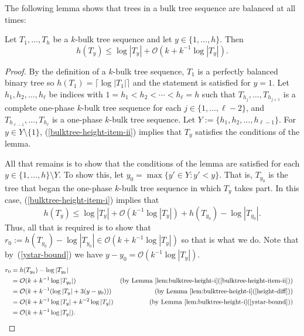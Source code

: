 \documentclass[kpfonts]{patmorin}
\newcommand{\Oh}{\mathcal{O}}
\let\le\leqslant
\begin{document}
The following lemma shows that trees in a bulk tree sequence are balanced at all times:

\begin{lem}
  Let $T_1,\ldots,T_h$ be a $k$-bulk tree sequence and let $y\in\{1,\ldots,h\}$.
  Then
\[
h(T_y)\le \log|T_y| + \Oh(k+k^{-1}\log|T_y|).
\]
\end{lem}

\begin{proof}
  By the definition of a $k$-bulk tree sequence, $T_1$ is a perfectly balanced binary tree so $h(T_1)=\lceil\log|T_1|\rceil$ and the statement is satisfied for $y=1$.
  Let $h_1,h_2,\ldots,h_{\ell}$ be indices with $1=h_1 < h_2 < \cdots <h_{\ell} = h$ such that $T_{h_j},\ldots,T_{h_{j+1}}$ is a complete one-phase $k$-bulk tree sequence for each $j\in\{1,\ldots,\ell-2\}$, and $T_{h_{\ell-1}},\ldots,T_{h_{\ell}}$ is a one-phase $k$-bulk tree sequence.
  Let $Y:= \{h_1,h_2,\ldots,h_{\ell-1}\}$.
  For $y\in Y\setminus\{1\}$,
  (\ref{bulktree-height-item-ii}) implies that $T_y$ satisfies the conditions of the lemma.

  All that remains is to show that the conditions of the lemma are satisfied for each $y\in\{1,\ldots,h\}\setminus Y$. To show this, let $y_0=\max\{ y'\in Y: y'<y\}$.  That is, $T_{y_0}$ is the tree that began the one-phase $k$-bulk tree sequence in which $T_y$ takes part.
  In this case, (\ref{bulktree-height-item-i}) implies that
  \[  h(T_y) \le \log |T_y| + \Oh(k^{-1}\log |T_y|) + h(T_{y_0})-\log|T_{y_0}|.\]
  Thus, all that is required is to show that $r_0:=h(T_{y_0})-\log|T_{y_0}|\in \Oh(k+k^{-1}\log|T_y|)$ so that is what we do.
  Note that by~(\ref{ystar-bound})
  we have $y-y_0 = \Oh(k^{-1}\log|T_y|)$.
  \begin{align*}
    r_0 &= h(T_{y_0})-\log|T_{y_0}| \\
       &= \Oh(k + k^{-1}\log|T_{y_0}|)
        & \text{(by \lemref{bulktree-height-i}(\ref{bulktree-height-item-ii}))}\\
       &= \Oh(k + k^{-1}(\log|T_{y}| + 3(y-y_0)))
        & \text{(by \lemref{bulktree-height-i}(\ref{height-diff}))} \\
       &= \Oh(k + k^{-1}\log|T_{y}| + k^{-2}\log|T_{y}|) & \text{(by \lemref{bulktree-height-i}(\ref{ystar-bound}))} \\
       &= \Oh(k + k^{-1}\log|T_{y}|).  &  & \qedhere
  \end{align*}
\end{proof}
\end{document}
